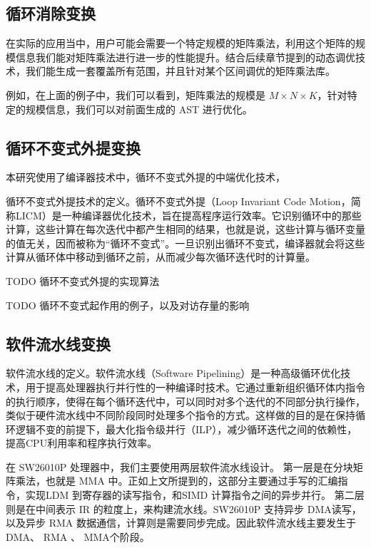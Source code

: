 \subsection{循环消除变换}

在实际的应用当中，用户可能会需要一个特定规模的矩阵乘法，利用这个矩阵的规模信息我们能对矩阵乘法进行进一步的性能提升。结合后续章节提到的动态调优技术，我们能生成一套覆盖所有范围，并且针对某个区间调优的矩阵乘法库。

例如，在上面的例子中，我们可以看到，矩阵乘法的规模是 $M \times N \times K$，针对特定的规模信息，我们可以对前面生成的 AST 进行优化。

\subsection{循环不变式外提变换}

本研究使用了编译器技术中，循环不变式外提的中端优化技术，

循环不变式外提技术的定义。循环不变式外提（Loop Invariant Code Motion，简称LICM）是一种编译器优化技术，旨在提高程序运行效率。它识别循环中的那些计算，这些计算在每次迭代中都产生相同的结果，也就是说，这些计算与循环变量的值无关，因而被称为“循环不变式”。一旦识别出循环不变式，编译器就会将这些计算从循环体中移动到循环之前，从而减少每次循环迭代时的计算量。


TODO 循环不变式外提的实现算法


TODO 循环不变式起作用的例子，以及对访存量的影响





\subsection{软件流水线变换}

软件流水线的定义。软件流水线（Software Pipelining）是一种高级循环优化技术，用于提高处理器执行并行性的一种编译时技术。它通过重新组织循环体内指令的执行顺序，使得在每个循环迭代中，可以同时对多个迭代的不同部分执行操作，类似于硬件流水线中不同阶段同时处理多个指令的方式。这样做的目的是在保持循环逻辑不变的前提下，最大化指令级并行（ILP），减少循环迭代之间的依赖性，提高CPU利用率和程序执行效率。

在 SW26010P 处理器中，我们主要使用两层软件流水线设计。
第一层是在分块矩阵乘法，也就是 MMA 中。正如上文所提到的，这部分主要通过手写的汇编指令，实现LDM 到寄存器的读写指令，和SIMD 计算指令之间的异步并行。
第二层则是在中间表示 IR 的粒度上，来构建流水线。SW26010P 支持异步 DMA读写，以及异步 RMA 数据通信，计算则是需要同步完成。因此软件流水线主要发生于DMA、 RMA 、 MMA个阶段。




